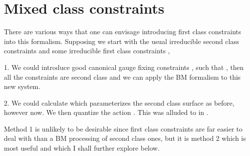\documentclass[a4paper,12pt]{article}
\theoremstyle{definition}
\theoremstyle{remark}
\numberwithin{equation}{section}
\providecommand{\al}{\alpha}
\providecommand{\bx}{\bar{x}}
\begin{document}
\section{Mixed class constraints}

There are various ways that one can envisage introducing first
class constraints into this formalism. Supposing we start with the
usual irreducible second class constraints \myHighlight{$\theta^{\al}(x)$}\coordHE{} and
some irreducible first class constraints \coordHE{},

1. We could introduce good canonical gauge fixing constraints
\cite{Henneaux:1992ig} \coordHE{}, such that \coordHE{}, then all the constraints are second
class and we can apply the BM formalism to this new system.

2. We could calculate \myHighlight{$\bx^i(x)$}\coordHE{} which parameterizes the second
class surface as before, however \myHighlight{$g^a(\bx) \neq 0$}\coordHE{} now. We then
quantize the action \myHighlight{$S[\bx(x)]$}\coordHE{}. This was alluded to in
\cite{Lyakhovich:2001cm}.

Method 1 is unlikely to be desirable since first class constraints
are far easier to deal with than a BM processing of second class
ones, but it is method 2 which is most useful and which I shall
further explore below.
\end{document}
